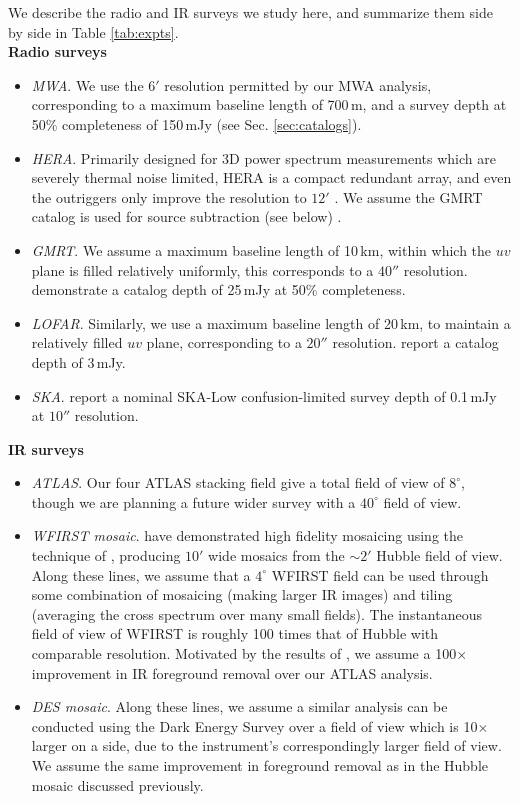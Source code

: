 \documentclass[numberedappendix]{emulateapj}
\begin{document}
We describe the radio and IR surveys we study here, and summarize them side by side in Table \ref{tab:expts}. \\

\noindent\textbf{Radio surveys}
\begin{itemize}
\item \textit{MWA}. We use the $6'$ resolution permitted by our MWA analysis, corresponding to a maximum baseline length of 700\,m, and a survey depth at 50\% completeness of 150\,mJy (see Sec. \ref{sec:catalogs}).
\item \textit{HERA}. Primarily designed for 3D power spectrum measurements which are severely thermal noise limited, HERA is a compact redundant array, and even the outriggers only improve the resolution to $12'$ \citep{deboer16}. We assume the GMRT catalog is used for source subtraction (see below) .
\item \textit{GMRT}. We assume a maximum baseline length of 10\,km, within which the $uv$ plane is filled relatively uniformly, this corresponds to a $40''$ resolution. \citet{intema17} demonstrate a catalog depth of 25\,mJy at 50\% completeness.
\item \textit{LOFAR}. Similarly, we use a maximum baseline length of 20\,km, to maintain a relatively filled $uv$ plane, corresponding to a $20''$ resolution. \citet{lofareorpaper} report a catalog depth of 3\,mJy. 
\item \textit{SKA}. \citet{prandoni15} report a nominal SKA-Low confusion-limited survey depth of 0.1\,mJy at $10''$ resolution.
\end{itemize}

\noindent\textbf{IR surveys}
\begin{itemize}
\item \textit{ATLAS}. Our four ATLAS stacking field give a total field of view of $8^\circ$, though we are planning a future wider survey with a $40^\circ$ field of view. 
\item \textit{WFIRST mosaic}. \citet{mw15} have demonstrated high fidelity mosaicing using the technique of \citet{fixen00}, producing $10'$ wide mosaics from the $\sim2'$ Hubble field of view. Along these lines, we assume that a $4^\circ$ WFIRST field can be used through some combination of mosaicing (making larger IR images) and tiling (averaging the cross spectrum over many small fields). The instantaneous field of view of WFIRST is roughly 100 times that of Hubble with comparable resolution. Motivated by the results of \citet{mw15}, we assume a 100$\times$ improvement in IR foreground removal over our ATLAS analysis.
\item \textit{DES mosaic}. Along these lines, we assume a similar analysis can be conducted using the Dark Energy Survey \citep{des16} over a field of view which is 10$\times$ larger on a side, due to the instrument's correspondingly larger field of view. We assume the same improvement in foreground removal as in the Hubble mosaic discussed previously.
\end{itemize}
\end{document}
